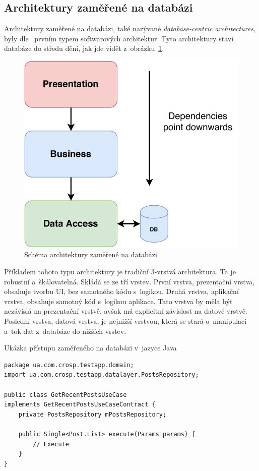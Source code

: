 \subsection{Architektury zaměřené na databázi}

Architektury zaměřené na databázi,
také nazývané \emph{database-centric architectures},
byly dle~\cite{architecture} prvním typem softwarových architektur.
Tyto architektury staví databáze do středu dění,
jak jde vidět z~obrázku~\ref{fig:architecture_database}.

\begin{figure}
    \centering
    \includegraphics[width=0.5\linewidth]{assets/technology-research/architecture/database-centric.pdf}
    \caption{Schéma architektury zaměřené na databázi~\cite{architecture}}
    \label{fig:architecture_database}
\end{figure}

Příkladem tohoto typu architektury je tradiční 3-vrstvá architektura.
Ta je robustní a~škálovatelná.
Skládá se ze tří vrstev.
První vrstva,
prezentační vrstva,
obsahuje tvorbu UI,
bez samotného kódu s~logikou.
Druhá vrstva,
aplikační vrstva,
obsahuje samotný kód s~logikou aplikace.
Tato vrstva by měla být nezávislá na prezentační vrstvě,
avšak má explicitní závislost na datové vrstvě.
Poslední vrstva,
datová vrstva,
je nejnižší vrstvou,
která se stará o~manipulaci a~tok dat z~databáze do
nižších vrstev.~\cite{architecture}

\begin{listing}
    \caption{Ukázka přístupu zaměřeného na databázi v~jazyce Java~\cite{architecture}}
    \label{code:architecture-database}
    \begin{verbatim}
package ua.com.crosp.testapp.domain;
import ua.com.crosp.testapp.datalayer.PostsRepository;

public class GetRecentPostsUseCase
implements GetRecentPostsUseCaseContract {
    private PostsRepository mPostsRepository;

    public Single<Post.List> execute(Params params) {
        // Execute
    }
}
    \end{verbatim}
\end{listing}

